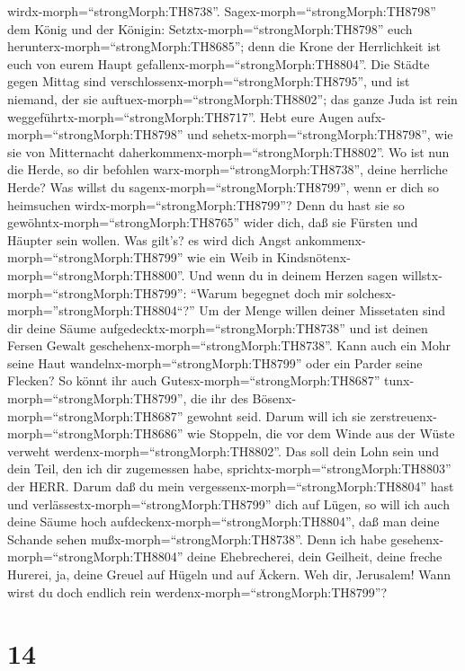 wirdx-morph=``strongMorph:TH8738''. 
Sagex-morph=``strongMorph:TH8798'' dem König und der Königin:
Setztx-morph=``strongMorph:TH8798'' euch
herunterx-morph=``strongMorph:TH8685''; denn die Krone der Herrlichkeit
ist euch von eurem Haupt gefallenx-morph=``strongMorph:TH8804''.
 Die Städte gegen Mittag sind
verschlossenx-morph=``strongMorph:TH8795'', und ist niemand, der sie
auftuex-morph=``strongMorph:TH8802''; das ganze Juda ist rein
weggeführtx-morph=``strongMorph:TH8717''.  Hebt eure Augen
aufx-morph=``strongMorph:TH8798'' und
sehetx-morph=``strongMorph:TH8798'', wie sie von Mitternacht
daherkommenx-morph=``strongMorph:TH8802''. Wo ist nun die Herde, so dir
befohlen warx-morph=``strongMorph:TH8738'', deine herrliche Herde?
 Was willst du sagenx-morph=``strongMorph:TH8799'', wenn er
dich so heimsuchen wirdx-morph=``strongMorph:TH8799''? Denn du hast sie
so gewöhntx-morph=``strongMorph:TH8765'' wider dich, daß sie Fürsten und
Häupter sein wollen. Was gilt's? es wird dich Angst
ankommenx-morph=``strongMorph:TH8799'' wie ein Weib in
Kindsnötenx-morph=``strongMorph:TH8800''.  Und wenn du in
deinem Herzen sagen willstx-morph=``strongMorph:TH8799'': ``Warum
begegnet doch mir solchesx-morph=''strongMorph:TH8804``?'' Um der Menge
willen deiner Missetaten sind dir deine Säume
aufgedecktx-morph=``strongMorph:TH8738'' und ist deinen Fersen Gewalt
geschehenx-morph=``strongMorph:TH8738''.  Kann auch ein
Mohr seine Haut wandelnx-morph=``strongMorph:TH8799'' oder ein Parder
seine Flecken? So könnt ihr auch Gutesx-morph=``strongMorph:TH8687''
tunx-morph=``strongMorph:TH8799'', die ihr des
Bösenx-morph=``strongMorph:TH8687'' gewohnt seid.  Darum
will ich sie zerstreuenx-morph=``strongMorph:TH8686'' wie Stoppeln, die
vor dem Winde aus der Wüste verweht
werdenx-morph=``strongMorph:TH8802''.  Das soll dein Lohn
sein und dein Teil, den ich dir zugemessen habe,
sprichtx-morph=``strongMorph:TH8803'' der HERR. Darum daß du mein
vergessenx-morph=``strongMorph:TH8804'' hast und
verlässestx-morph=``strongMorph:TH8799'' dich auf Lügen, 
so will ich auch deine Säume hoch
aufdeckenx-morph=``strongMorph:TH8804'', daß man deine Schande sehen
mußx-morph=``strongMorph:TH8738''.  Denn ich habe
gesehenx-morph=``strongMorph:TH8804'' deine Ehebrecherei, dein Geilheit,
deine freche Hurerei, ja, deine Greuel auf Hügeln und auf Äckern. Weh
dir, Jerusalem! Wann wirst du doch endlich rein
werdenx-morph=``strongMorph:TH8799''?

\hypertarget{section-13}{%
\section{14}\label{section-13}}

